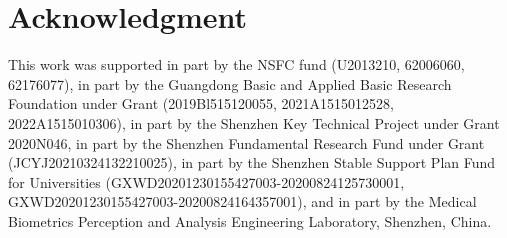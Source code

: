 \documentclass[journal]{IEEEtran}
\begin{document}
\section*{Acknowledgment}
This work was supported in part by the NSFC fund (U2013210, 62006060, 62176077), in part by the Guangdong Basic and Applied Basic Research Foundation under Grant (2019Bl515120055, 2021A1515012528, 2022A1515010306), in part by the Shenzhen Key Technical Project under Grant 2020N046, in part by the Shenzhen Fundamental Research Fund under Grant (JCYJ20210324132210025), in part by the Shenzhen Stable Support Plan Fund for Universities (GXWD20201230155427003-20200824125730001, GXWD20201230155427003-20200824164357001), and in part by the Medical Biometrics Perception and Analysis Engineering Laboratory, Shenzhen, China.





\ifCLASSOPTIONcaptionsoff
  \newpage
\fi









\end{document}
